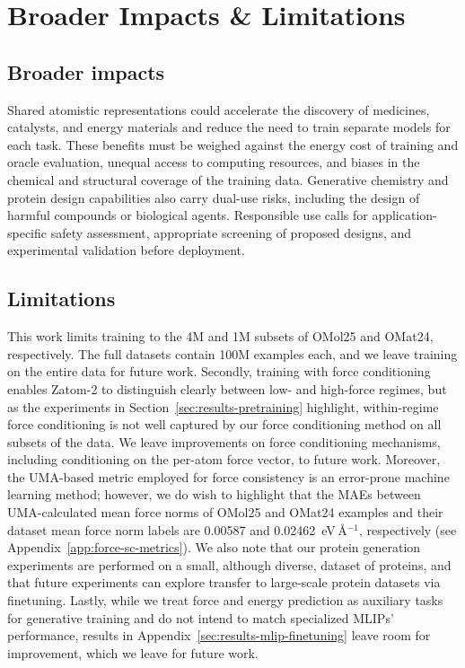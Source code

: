 \documentclass{article} %
\begin{document}
\clearpage

\section{Broader Impacts \& Limitations}
\label{app:broader-impacts-and-limitations}

\subsection{Broader impacts}
\label{app:broader-impacts}

Shared atomistic representations could accelerate the discovery of medicines,
catalysts, and energy materials and reduce the need to train separate models
for each task. These benefits must be weighed against the energy cost of
training and oracle evaluation, unequal access to computing resources, and
biases in the chemical and structural coverage of the training data.
Generative chemistry and protein design capabilities also carry dual-use
risks, including the design of harmful compounds or biological agents.
Responsible use calls for application-specific safety assessment, appropriate
screening of proposed designs, and experimental validation before deployment.

\subsection{Limitations}
\label{app:limitations}

This work limits training to the 4M and 1M subsets of OMol25 and OMat24, respectively. The full datasets contain 100M examples each, and we leave training on the entire data for future work. Secondly, training with force conditioning enables Zatom-2 to distinguish clearly between low- and high-force regimes, but as the experiments in Section~\ref{sec:results-pretraining} highlight, within-regime force conditioning is not well captured by our force conditioning method on all subsets of the data. We leave improvements on force conditioning mechanisms, including conditioning on the per-atom force vector, to future work. Moreover, the UMA-based metric employed for force consistency is an error-prone machine learning method; however, we do wish to highlight that the MAEs between UMA-calculated mean force norms of OMol25 and OMat24 examples and their dataset mean force norm labels are 0.00587 and 0.02462~eV\,\AA$^{-1}$, respectively (see Appendix~\ref{app:force-sc-metrics}). We also note that our protein generation experiments are performed on a small, although diverse, dataset of proteins, and that future experiments can explore transfer to large-scale protein datasets via finetuning. Lastly, while we treat force and energy prediction as auxiliary tasks for generative training and do not intend to match specialized MLIPs' performance, results in Appendix~\ref{sec:results-mlip-finetuning} leave room for improvement, which we leave for future work. 
\end{document}
